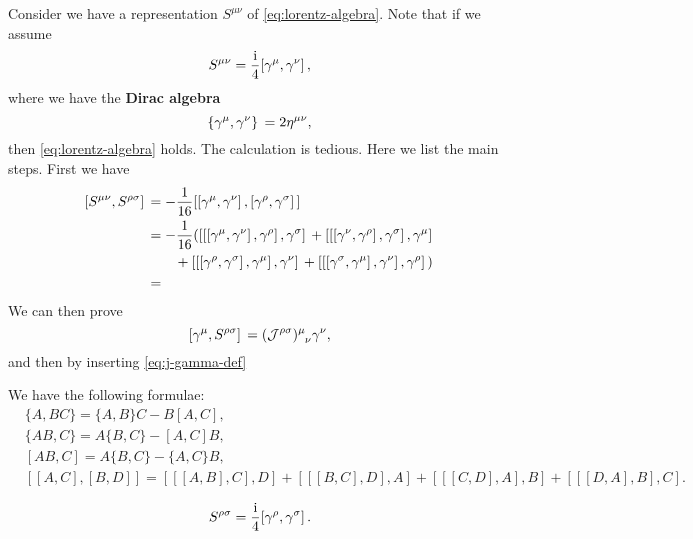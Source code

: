 \documentclass[hyperref, a4paper]{article}
\newcommand*{\ii}{\mathrm{i}}
\newcommand*{\concept}[1]{{\textbf{#1}}}
\begin{document}
Consider we have a representation $S^{\mu \nu}$ of \eqref{eq:lorentz-algebra}. Note that if we assume 
\begin{equation}
    S^{\mu \nu} = \frac{\ii}{4} \comm*{\gamma^\mu}{\gamma^\nu},
    \label{eq:j-gamma-def}
\end{equation}
where we have the \concept{Dirac algebra}
\begin{equation}
    \acomm*{\gamma^\mu}{\gamma^\nu} = 2 \eta^{\mu \nu}, 
\end{equation}
then \eqref{eq:lorentz-algebra} holds. The calculation is tedious. Here we list the main steps. First we have 
\[
    \begin{aligned}
        \comm*{S^{\mu \nu}}{S^{\rho \sigma}} &= - \frac{1}{16} \comm*{\comm*{\gamma^\mu}{\gamma^\nu}}{\comm*{\gamma^\rho}{\gamma^\sigma}} \\
        &= - \frac{1}{16} (\comm*{\comm*{\comm*{\gamma^\mu}{\gamma^\nu}}{\gamma^\rho}}{\gamma^\sigma} 
        + \comm*{\comm*{\comm*{\gamma^\nu}{\gamma^\rho}}{\gamma^\sigma}}{\gamma^\mu} \\
        &\quad \quad + \comm*{\comm*{\comm*{\gamma^\rho}{\gamma^\sigma}}{\gamma^\mu}}{\gamma^\nu} 
        + \comm*{\comm*{\comm*{\gamma^\sigma}{\gamma^\mu}}{\gamma^\nu}}{\gamma^\rho}) \\
        &= 
    \end{aligned}
\]
We can then prove 
\begin{equation}
    \comm*{\gamma^\mu}{S^{\rho \sigma}} = (\mathcal{J}^{\rho \sigma}) \indices{^\mu_\nu} \gamma^\nu,
\end{equation}
and then by inserting \eqref{eq:j-gamma-def} 

\begin{note*}{}{}
    We have the following formulae:
    \[
        \begin{aligned}
            &\{A,BC\}=\{A,B\}C-B[A,C], \\ 
            &\{AB,C\}=A\{B,C\}-[A,C]B, \\ 
            &[AB,C]=A\{B,C\}-\{A,C\}B, \\
            &[[A,C],[B,D]]=[[[A,B],C],D]+[[[B,C],D],A]+[[[C,D],A],B]+[[[D,A],B],C].
        \end{aligned}
    \]
\end{note*}

\begin{equation}
    S^{\rho \sigma} = \frac{\ii}{4} \comm*{\gamma^\rho}{\gamma^\sigma}.
\end{equation}
\end{document}
